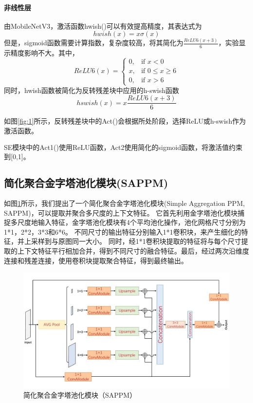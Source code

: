 \documentclass[11pt]{article}
\begin{document}
\paragraph{非线性层}
由MobileNetV3，激活函数hwish()可以有效提高精度，其表达式为
\[hwish(x)=x\sigma(x)\]
但是，sigmoid函数需要计算指数，复杂度较高，\cite{ref12}将其简化为$\frac{ReLU6(x+3)}6$，实验显示精度影响不大。其中，
\[ReLU6(x) = 
\begin{cases}
    0, & \text{if } x < 0 \\
    x, & \text{if } 0 \leq x \geq 6 \\
    0, & \text{if } x  >6
\end{cases}\]
同时，hwish函数被简化为反转残差块中应用的h-swish函数
\[hswish(x)=x\frac{ReLU6(x+3)}6\]

如图\ref{fig:1}所示，反转残差块中的Act()会根据所处阶段，选择ReLU或h-swish作为激活函数。

SE模块中的Act1()使用ReLU函数，Act2使用简化的sigmoid函数，将激活值约束到[0,1]。

\subsection{简化聚合金字塔池化模块(SAPPM)}
如图\ref{fig:2}所示，我们提出了一个简化聚合金字塔池化模块(Simple Aggregation PPM, SAPPM)，可以提取并聚合多尺度的上下文特征。
它首先利用金字塔池化模块捕捉多尺度地输入特征，金字塔池化模块有4个平均池化操作，池化网格尺寸分别为1*1，2*2，3*3和6*6。
不同尺寸的输出特征分别输入1*1卷积块，来产生细化的特征，并上采样到与原图同一大小。
同时，经1*1卷积块提取的特征将与每个尺寸提取的上下文特征平行相加合并，得到不同尺寸的融合特征。最后，经过两次沿维度连接和残差连接，使用卷积块提取聚合特征，得到最终输出。
\begin{figure}[!h]
  \centering
  \includegraphics[width=12cm]{sappm.png}

  \centering
  \caption{简化聚合金字塔池化模块（SAPPM）}
  \label{fig:2}
\end{figure}
\end{document}
